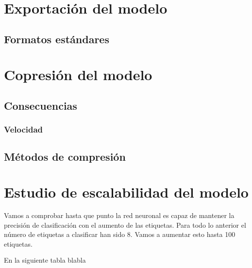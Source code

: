 \section{Exportación del modelo}

\subsection{Formatos estándares}

\subsubsection{}


\section{Copresión del modelo}

\subsection{Consecuencias}

\subsubsection{Velocidad}

\subsubsection{}

\subsection{Métodos de compresión}

\subsubsection{}

\subsubsection{}


\section{Estudio de escalabilidad del modelo}

Vamos a comprobar hasta que punto la red neuronal es capaz de mantener la precisión de clasificación con el aumento de las etiquetas. Para todo lo anterior el número de etiquetas a clasificar han sido 8. Vamos a aumentar esto hasta 100 etiquetas.

En la siguiente tabla blabla